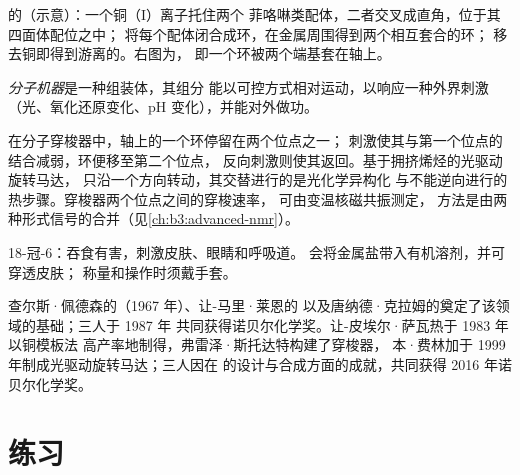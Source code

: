 \begin{omfigure}
{\small {}的（示意）：一个铜（I）离子托住两个
菲咯啉类配体，二者交叉成直角，位于其四面体配位之中；
将每个配体闭合成环，在金属周围得到两个相互套合的环；
移去铜即得到游离的。右图为，
即一个环被两个端基套在轴上。}
\end{omfigure}

\begin{definition}[分子机器]\label{def:b3:supramolecular:machine}
\emph{分子机器}是一种组装体，其组分
能以可控方式相对运动，以响应一种外界刺激
（光、氧化还原变化、pH 变化），并能对外做功。
\end{definition}

在分子穿梭器中，轴上的一个环停留在两个位点之一；
刺激使其与第一个位点的结合减弱，环便移至第二个位点，
反向刺激则使其返回。基于拥挤烯烃的光驱动旋转马达，
只沿一个方向转动，其交替进行的是光化学异构化
与不能逆向进行的热步骤。穿梭器两个位点之间的穿梭速率，
可由变温核磁共振测定，
方法是由两种形式信号的合并（见\cref{ch:b3:advanced-nmr}）。

\begin{safety}{}
18-冠-6：吞食有害，刺激皮肤、眼睛和呼吸道。
会将金属盐带入有机溶剂，并可穿透皮肤；
称量和操作时须戴手套。
\end{safety}

\begin{history}[超分子化学及其机器]
查尔斯·佩德森的（1967 年）、让-马里·莱恩的
以及唐纳德·克拉姆的奠定了该领域的基础；三人于 1987 年
共同获得诺贝尔化学奖。让-皮埃尔·萨瓦热于 1983 年以铜模板法
高产率地制得，弗雷泽·斯托达特构建了穿梭器，
本·费林加于 1999 年制成光驱动旋转马达；三人因在
的设计与合成方面的成就，共同获得 2016 年诺贝尔化学奖。
\end{history}

\section{练习}

